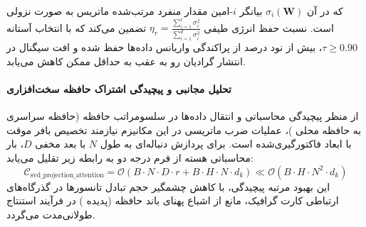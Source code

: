 
که در آن $\sigma_i(\mathbf{W})$ بیانگر $i$-امین مقدار منفرد مرتب‌شده ماتریس به صورت نزولی است. نسبت حفظ انرژی طیفی $\eta_r = \frac{\sum_{i=1}^r \sigma_i^2}{\sum_{i=1}^{d} \sigma_i^2}$ تضمین می‌کند که با انتخاب آستانه $\tau \ge 0.90$، بیش از نود درصد از پراکندگی واریانس داده‌ها حفظ شده و افت سیگنال در انتشار گرادیان رو به عقب به حداقل ممکن کاهش می‌یابد.

\paragraph{تحلیل مجانبی و پیچیدگی اشتراک حافظه سخت‌افزاری}
از منظر پیچیدگی محاسباتی و انتقال داده‌ها در سلسومراتب حافظه (حافظه سراسری  به حافظه محلی )، عملیات ضرب ماتریسی در این مکانیزم نیازمند تخصیص بافر موقت با ابعاد فاکتورگیری‌شده است. برای پردازش دنباله‌ای به طول $N$ با بعد مخفی $D$، بار محاسباتی هسته از فرم درجه دو به رابطه زیر تقلیل می‌یابد:
\begin{equation}
\label{eq:complexity_svd_projection_attention}
\mathcal{C}_{\text{svd\_projection\_attention}} = \mathcal{O}\left( B \cdot N \cdot D \cdot r + B \cdot H \cdot N \cdot d_k \right) \ll \mathcal{O}\left( B \cdot H \cdot N^2 \cdot d_k \right)
\end{equation}
این بهبود مرتبه پیچیدگی، با کاهش چشمگیر حجم تبادل تانسورها در گذرگاه‌های ارتباطی کارت گرافیک، مانع از اشباع پهنای باند حافظه (پدیده ) در فرآیند استنتاج طولانی‌مدت می‌گردد.